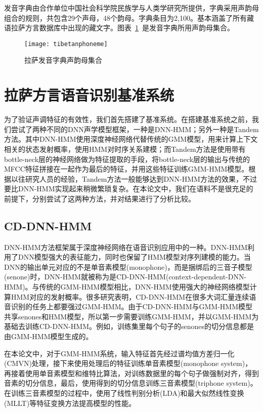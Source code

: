 发音字典由合作单位中国社会科学院民族学与人类学研究所提供，字典采用声韵母组合的规则，共包含29个声母，48个韵母。字典条目为2,100。基本涵盖了所有藏语拉萨方言数据库中出现的藏文字。图表~\ref{fig:tibetanphoneme}~是发音字典所用声韵母集合。
\begin{figure}[htbp]
\centering
\texttt{[image: tibetanphoneme]}
\caption{拉萨发音字典声韵母集合}\label{fig:tibetanphoneme}
\vspace{\baselineskip}
\end{figure}

\section{拉萨方言语音识别基准系统}
为了验证声调特征的有效性，我们首先搭建了基准系统。在搭建基准系统之前，我们尝试了两种不同的DNN声学模型框架，一种是DNN-HMM\cite{dahl2012context}；另外一种是Tandem方法\cite{hermansky2000tandem}。其中DNN-HMM使用深度神经网络代替传统的GMM模型，用来计算上下文相关的状态发射概率，使用HMM对时序关系建模；而Tandem方法是使用带有bottle-neck层的神经网络做为特征提取的手段，将bottle-neck层的输出与传统的MFCC特征拼接在一起作为最后的特征，并用这些特征训练GMM-HMM模型。根据以往研究人员的经验，Tandem方法一般能够达到DNN-HMM方法的效果，不过要比DNN-HMM实现起来稍微繁琐复杂。在本论文中，我们在语料不是很充足的前提下，分别尝试了这两种方法，并对结果进行了分析比较。
\subsection{CD-DNN-HMM}
DNN-HMM方法框架属于深度神经网络在语音识别应用中的一种。DNN-HMM利用了DNN模型强大的表征能力，同时也保留了HMM模型对序列建模的能力。当DNN的输出单元对应的不是单音素模型(monophone)，而是捆绑后的三音子模型(senone)时，DNN-HMM就被称为是CD-DNN-HMM(context-dependent-DNN-HMM)。与传统的GMM-HMM模型相比，DNN-HMM使用强大的神经网络模型计算HMM对应的发射概率。很多研究表明，CD-DNN-HMM在很多大词汇量连续语音识别的任务上都要强过GMM-HMM。由于CD-DNN-HMM与GMM-HMM模型共享senones和HMM模型，所以第一步需要训练GMM-HMM，并以GMM-HMM为基础去训练CD-DNN-HMM。例如，训练集里每个句子的senones的切分信息都是由GMM-HMM模型生成的。

在本论文中，对于GMM-HMM系统，输入特征首先经过谱均值方差归一化(CMVN)处理，接下来使用处理后的特征训练单音素模型(monophone system)，再接着使用单音素模型和维特比算法，对训练数据里的每个句子做强制对齐，得到音素的切分信息，最后，使用得到的切分信息训练三音素模型(triphone system)。在训练三音素模型的过程中，使用了线性判别分析(LDA)和最大似然线性变换(MLLT)等特征变换方法提高模型的性能。


